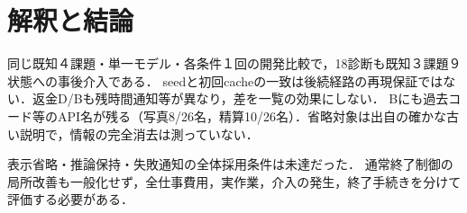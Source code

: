 \documentclass[uplatex,a4paper,twocolumn,10pt]{jsarticle}
\begin{document}



\section{解釈と結論}
同じ既知４課題・単一モデル・各条件１回の開発比較で，18診断も既知３課題９状態への事後介入である．
seedと初回cacheの一致は後続経路の再現保証ではない．返金D/Bも残時間通知等が異なり，差を一覧の効果にしない．
Bにも過去コード等のAPI名が残る（写真8/26名，精算10/26名）．省略対象は出自の確かな古い説明で，情報の完全消去は測っていない．

表示省略・推論保持・失敗通知の全体採用条件は未達だった．
通常終了制御の局所改善も一般化せず，全仕事費用，実作業，介入の発生，終了手続きを分けて評価する必要がある．



\end{document}
